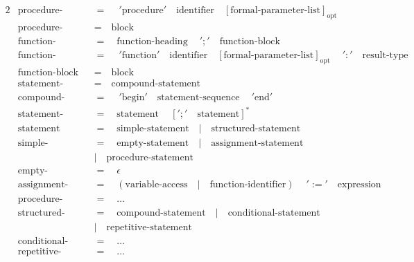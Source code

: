 \documentclass{article}
\begin{document}
\begin{alignat*}{2}
&\text{procedure-heading}\quad&&=\quad\ '\text{procedure}'\quad\text{identifier}\quad{[\text{formal-parameter-list}]}_\text{opt}\\
&\text{procedure-block}\quad&&=\quad\text{block}\\
&\text{function-declaration}\quad&&=\quad\text{function-heading}\quad\ ';'\quad\text{function-block}\\
&\text{function-heading}\quad&&=\quad\ '\text{function}'\quad\text{identifier}\quad{[\text{formal-parameter-list}]}_\text{opt}\quad\ ':'\quad \text{result-type}\\
&\text{function-block}\quad&&=\quad\text{block}\\
&\text{statement-part}\quad&&=\quad\text{compound-statement}\\
&\text{compound-statement}\quad&&=\quad\ '\text{begin}' \quad\text{statement-sequence}\quad\ '\text{end}'\\
&\text{statement-sequence}\quad&&=\quad\text{statement}\quad\ {[';'\quad\text{statement}]^*}\\
&\text{statement}\quad&&=\quad\text{simple-statement}\quad |\quad \text{structured-statement}\\
&\text{simple-statement}\quad&&=\quad\text{empty-statement}\quad |\quad \text{assignment-statement}\\
&&&|\quad \text{procedure-statement}\\
&\text{empty-statement}\quad&&=\quad\epsilon\\
&\text{assignment-statement}\quad&&=\quad(\text{variable-access}\quad|\quad\text{function-identifier})\quad\ ':='\quad\text{expression}\\
&\text{procedure-statement}\quad&&=\quad\dots\\
&\text{structured-statement}\quad&&=\quad\text{compound-statement}\quad|\quad\text{conditional-statement}\\
&&&|\quad\text{repetitive-statement}\\
&\text{conditional-statement}\quad&&=\quad\dots\\
&\text{repetitive-statement}\quad&&=\quad\dots
\end{alignat*}
\end{document}
